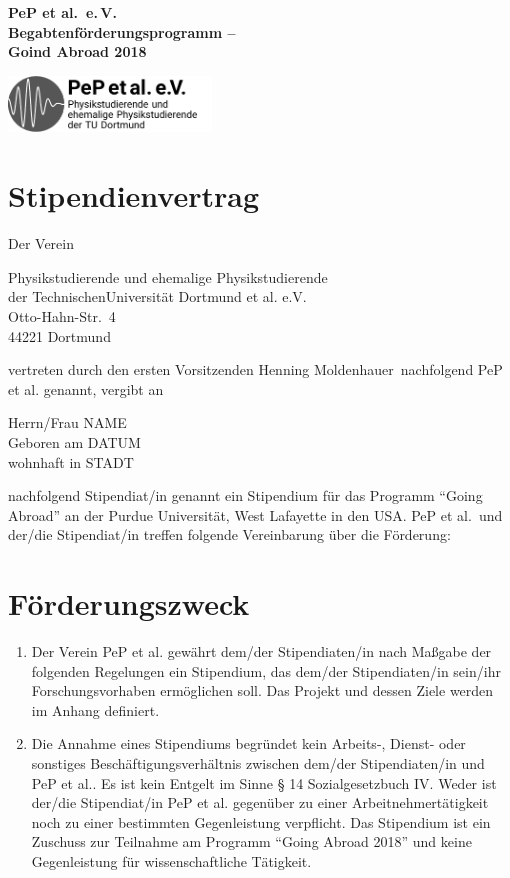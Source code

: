 \documentclass[
  paper=a4,
  fontsize=12pt,
  DIV=16,
  parskip=full,
  headinclude=true,
]{scrartcl}
\date{02. Februar 2015}
\newcommand\vorsitzender{Henning Moldenhauer}
\newcommand\stipyear{2018}    %
\newcommand\stipendiat{NAME}    %
\newcommand\stipgeburt{DATUM}   %
\newcommand\stipanschrift{STADT}  %
\begin{document}
  \begin{minipage}{0.45\textwidth}%
    \large\bfseries PeP et al.\ e.\,V.\\%
    Begabtenförderungsprogramm –\\%
    Goind Abroad \stipyear%
  \end{minipage}%
  \hfill%
  \begin{minipage}{0.45\textwidth}%
  \hfill\includegraphics[height=1.5cm]{../../../logos/pep.pdf}
  \end{minipage}%
\section*{Stipendienvertrag}

Der Verein

Physikstudierende und ehemalige Physikstudierende\\
der TechnischenUniversität Dortmund et al. e.V.\\
Otto-Hahn-Str.~4\\
44221 Dortmund

vertreten durch den ersten Vorsitzenden \vorsitzender\ nachfolgend
PeP et al. genannt, vergibt an

Herrn/Frau \stipendiat \\
Geboren am \stipgeburt \\
wohnhaft in \stipanschrift

nachfolgend Stipendiat/in genannt ein Stipendium für das Programm
\enquote{Going Abroad} an der Purdue Universität, West Lafayette in den USA.
PeP et al.\ und der/die Stipendiat/in treffen folgende Vereinbarung über die
Förderung:

\section{Förderungszweck}

\begin{enumerate}[\qquad(1)]
  \item Der Verein PeP et al. gewährt dem/der Stipendiaten/in nach
    Maßgabe der folgenden Regelungen ein Stipendium, das
    dem/der Stipendiaten/in sein/ihr Forschungsvorhaben ermöglichen soll.
    Das Projekt und dessen Ziele werden im Anhang definiert.
  \item Die Annahme eines Stipendiums begründet kein Arbeits-, Dienst-
    oder sonstiges Beschäftigungsverhältnis zwischen dem/der
    Stipendiaten/in und PeP et al.. Es ist kein Entgelt im Sinne
    § 14 Sozialgesetzbuch IV. Weder ist der/die Stipendiat/in
    PeP et al. gegenüber zu einer Arbeitnehmertätigkeit
    noch zu einer bestimmten Gegenleistung verpflicht.
    Das Stipendium ist ein Zuschuss zur Teilnahme am Programm
    \enquote{Going Abroad \stipyear} und keine Gegenleistung für
    wissenschaftliche Tätigkeit.
\end{enumerate}
\end{document}
